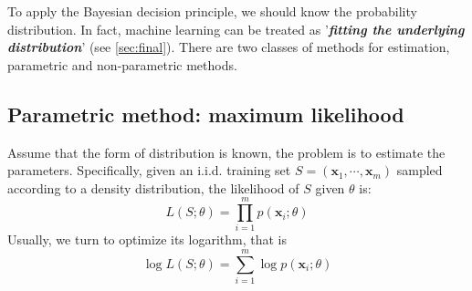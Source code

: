 \documentclass{article}
\begin{document}
	To apply the Bayesian decision principle, we should know the probability distribution. In fact, machine learning can be treated as '\textbf{\textit{fitting the underlying distribution}}' (see \ref{sec:final}). There are two classes of methods for estimation, parametric and non-parametric methods.
	
	\subsection{Parametric method: maximum likelihood}
	Assume that the form of distribution is known, the problem is to estimate the parameters. Specifically, given an i.i.d. training set $S = (\bm{x}_1,\cdots,\bm{x}_m)$ sampled according to a density distribution, the likelihood of $S$ given $\theta$ is:
	\begin{equation*}
	L(S;\theta) = \prod_{i=1}^m  p(\bm{x}_i;\theta)
	\end{equation*}
Usually, we turn to optimize its logarithm, that is
	\begin{equation}
	\log L(S;\theta) = \sum_{i=1}^m \log p(\bm{x}_i;\theta)
	\end{equation}
\end{document}
